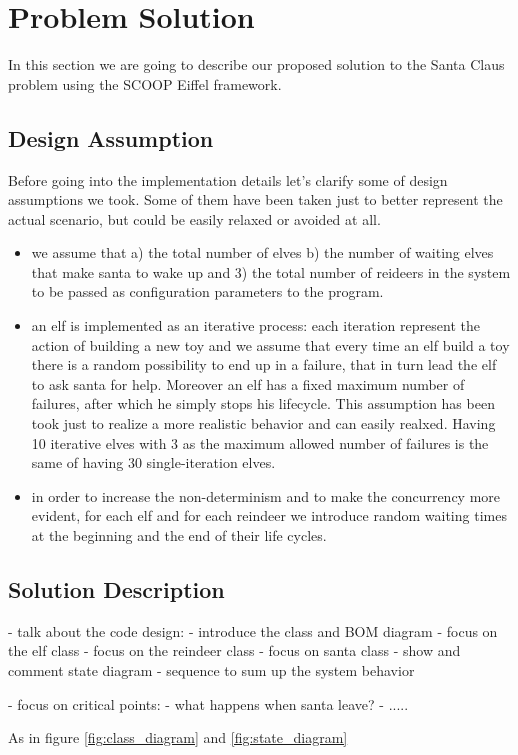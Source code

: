 \section{Problem Solution}
\label{sec:solution}

In this section we are going to describe our proposed solution to the Santa Claus problem using the SCOOP Eiffel framework. 

\subsection{Design Assumption}
\label{subsec:design}

Before going into the implementation details let's clarify some of design assumptions we took. Some of them have been taken just to better represent the actual scenario, but could be easily relaxed or avoided at all.

\begin{itemize}
	\item we assume that a) the total number of elves b) the number of waiting elves that make santa to wake up and 3) the total number of reideers in the system to be passed as configuration parameters to the program.
	\item an elf is implemented as an iterative process: each iteration represent the action of building a new toy and we assume that every time an elf build a toy there is a random possibility to end up in a failure, that in turn lead the elf to ask santa for help. Moreover an elf has a fixed maximum number of failures, after which he simply stops his lifecycle. This assumption has been took just to realize a more realistic behavior and can easily realxed. Having 10 iterative elves with 3 as the maximum allowed number of failures is the same of having 30 single-iteration elves.
	\item in order to increase the non-determinism and to make the concurrency more evident, for each elf and for each reindeer we introduce random waiting times at the beginning and the end of their life cycles.
\end{itemize}

\subsection{Solution Description}
\label{subsec:sol}

- talk about the code design: 
- introduce the class and BOM diagram
- focus on the elf class
- focus on the reindeer class
- focus on santa class
- show and comment state diagram
- sequence to sum up the system behavior

- focus on critical points:
- what happens when santa leave?
- .....

As in figure \ref{fig:class_diagram} and \ref{fig:state_diagram}

